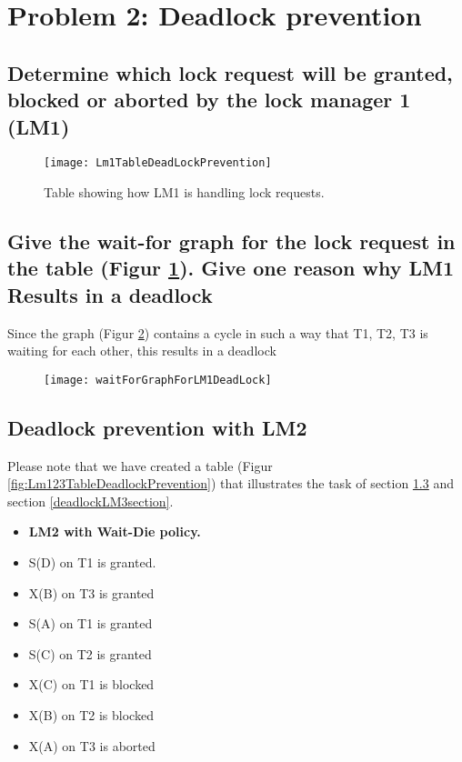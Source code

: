 \section{Problem 2: Deadlock prevention}
\subsection{Determine which lock request will be granted, blocked or aborted by the lock manager 1 (LM1)}\label{deadlockLM1section}

\begin{figure}[H]
\centering
\texttt{[image: Lm1TableDeadLockPrevention]}
\caption[Table showing how LM1 is handling locks]{Table showing how LM1 is handling lock requests.}
\label{fig:Lm1TableDeadlock}
\end{figure}
\pagebreak
\subsection{Give the wait-for graph for the lock request in the table (Figur \ref{fig:Lm1TableDeadlock}). Give one reason why LM1 Results in a deadlock }

Since the graph (Figur \ref{fig:waitForGraphForLM1DeadLock}) contains a cycle in such a way that T1, T2, T3 is waiting for each other, this results in a deadlock

\begin{figure} [H]
\centering
\texttt{[image: waitForGraphForLM1DeadLock]}
\caption[Wait-for graph of LM1 depicting a deadlock.]{}
\caption{}
\label{fig:waitForGraphForLM1DeadLock}
\end{figure}

	
\pagebreak
\subsection{Deadlock prevention with LM2} \label{deadlockLM2section}
Please note that we have created a table (Figur \ref{fig:Lm123TableDeadlockPrevention}) that illustrates the task of section \ref{deadlockLM2section} and section \ref{deadlockLM3section}.
\begin{itemize}
	\item{\textbf{LM2 with Wait-Die policy.}}
	\item S(D) on T1 is granted.
	\item X(B) on T3 is granted
	\item S(A) on T1 is granted
	\item S(C) on T2 is granted
	\item X(C) on T1 is blocked
	\item X(B) on T2 is blocked
	\item X(A) on T3 is aborted
\end{itemize}

